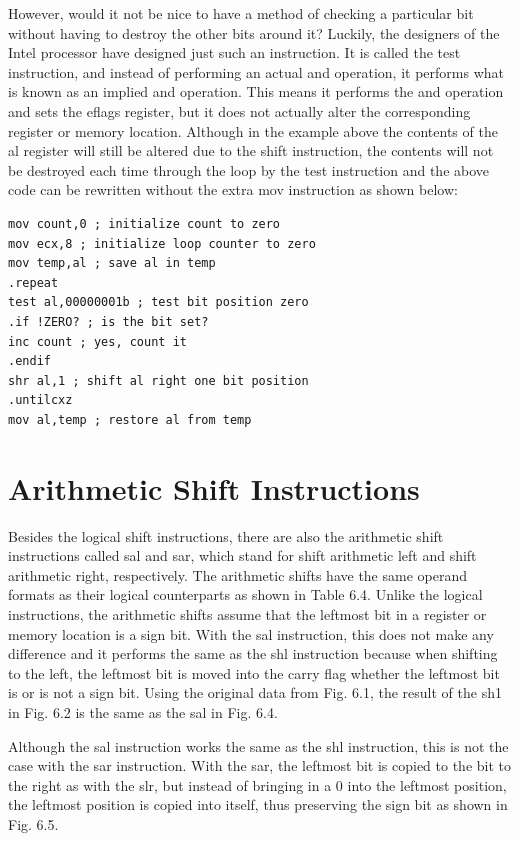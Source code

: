 \documentclass[10pt]{book}
\begin{document}
However, would it not be nice to have a method of checking a particular bit without having to destroy the other bits around it? Luckily, the designers of the Intel processor have designed just such an instruction. It is called the test instruction, and instead of performing an actual and operation, it performs what is known as an implied and operation. This means it performs the and operation and sets the eflags register, but it does not actually alter the corresponding register or memory location. Although in the example above the contents of the al register will still be altered due to the shift instruction, the contents will not be destroyed each time through the loop by the test instruction and the above code can be rewritten without the extra mov instruction as shown below:

\begin{verbatim}
mov count,0 ; initialize count to zero
mov ecx,8 ; initialize loop counter to zero
mov temp,al ; save al in temp
.repeat
test al,00000001b ; test bit position zero
.if !ZERO? ; is the bit set?
inc count ; yes, count it
.endif
shr al,1 ; shift al right one bit position
.untilcxz
mov al,temp ; restore al from temp
\end{verbatim}

\section{Arithmetic Shift Instructions}
Besides the logical shift instructions, there are also the arithmetic shift instructions called sal and sar, which stand for shift arithmetic left and shift arithmetic right, respectively. The arithmetic shifts have the same operand formats as their logical counterparts as shown in Table 6.4.
Unlike the logical instructions, the arithmetic shifts assume that the leftmost bit in a register or memory location is a sign bit. With the sal instruction, this does not make any difference and it performs the same as the shl instruction because when shifting to the left, the leftmost bit is moved into the carry flag whether the leftmost bit is or is not a sign bit. Using the original data from Fig. 6.1, the result of the sh1 in Fig. 6.2 is the same as the sal in Fig. 6.4.

Although the sal instruction works the same as the shl instruction, this is not the case with the sar instruction. With the sar, the leftmost bit is copied to the bit to the right as with the slr, but instead of bringing in a 0 into the leftmost position, the leftmost position is copied into itself, thus preserving the sign bit as shown in Fig. 6.5.
\end{document}
